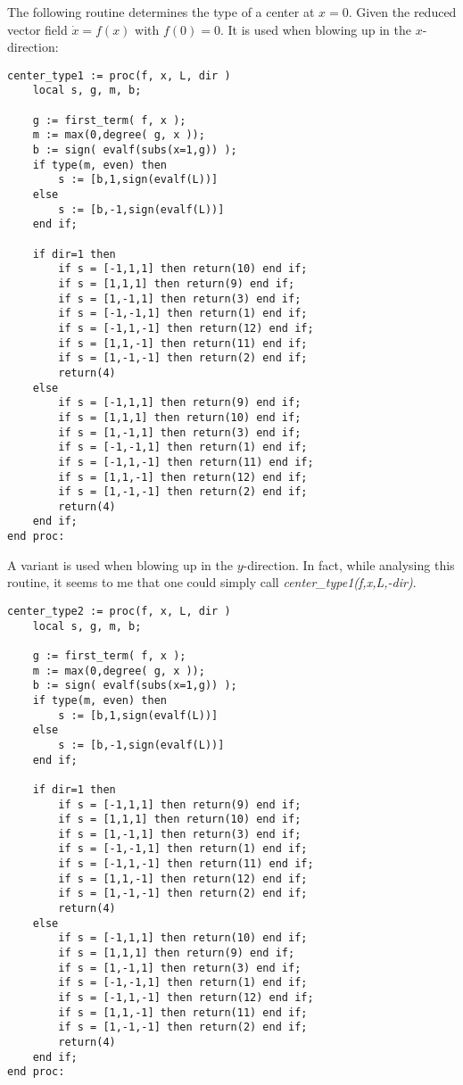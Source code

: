 \documentclass[a4paper,10pt]{article}
\begin{document}
The following routine determines the type of a center at $x=0$.  Given the reduced vector field $\dot{x}=f(x)$
with $f(0)=0$.  It is used when blowing up in the $x$-direction:

\begin{lstlisting}[name=blowup]
center_type1 := proc(f, x, L, dir )
    local s, g, m, b;

    g := first_term( f, x );
    m := max(0,degree( g, x ));
    b := sign( evalf(subs(x=1,g)) );
    if type(m, even) then
        s := [b,1,sign(evalf(L))]
    else
        s := [b,-1,sign(evalf(L))]
    end if;

    if dir=1 then
        if s = [-1,1,1] then return(10) end if;
        if s = [1,1,1] then return(9) end if;
        if s = [1,-1,1] then return(3) end if;
        if s = [-1,-1,1] then return(1) end if;
        if s = [-1,1,-1] then return(12) end if;
        if s = [1,1,-1] then return(11) end if;
        if s = [1,-1,-1] then return(2) end if;
        return(4)
    else
        if s = [-1,1,1] then return(9) end if;
        if s = [1,1,1] then return(10) end if;
        if s = [1,-1,1] then return(3) end if;
        if s = [-1,-1,1] then return(1) end if;
        if s = [-1,1,-1] then return(11) end if;
        if s = [1,1,-1] then return(12) end if;
        if s = [1,-1,-1] then return(2) end if;
        return(4)
    end if;
end proc:
\end{lstlisting}


A variant is used when blowing up in the $y$-direction.  In fact, while analysing this routine, it
seems to me that one could simply call {\slshape center\_type1(f,x,L,-dir)}.

\begin{lstlisting}[name=blowup]
center_type2 := proc(f, x, L, dir )
    local s, g, m, b;

    g := first_term( f, x );
    m := max(0,degree( g, x ));
    b := sign( evalf(subs(x=1,g)) );
    if type(m, even) then
        s := [b,1,sign(evalf(L))]
    else
        s := [b,-1,sign(evalf(L))]
    end if;

    if dir=1 then
        if s = [-1,1,1] then return(9) end if;
        if s = [1,1,1] then return(10) end if;
        if s = [1,-1,1] then return(3) end if;
        if s = [-1,-1,1] then return(1) end if;
        if s = [-1,1,-1] then return(11) end if;
        if s = [1,1,-1] then return(12) end if;
        if s = [1,-1,-1] then return(2) end if;
        return(4)
    else
        if s = [-1,1,1] then return(10) end if;
        if s = [1,1,1] then return(9) end if;
        if s = [1,-1,1] then return(3) end if;
        if s = [-1,-1,1] then return(1) end if;
        if s = [-1,1,-1] then return(12) end if;
        if s = [1,1,-1] then return(11) end if;
        if s = [1,-1,-1] then return(2) end if;
        return(4)
    end if;
end proc:
\end{lstlisting}
\end{document}
